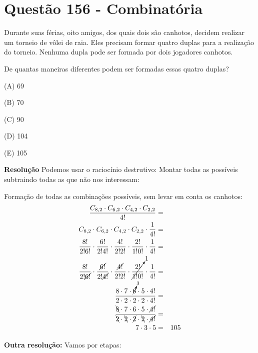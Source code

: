 \section{Questão 156 - Combinatória}

Durante suas férias, oito amigos, dos quais dois são canhotos, decidem realizar um torneio de vôlei de raia.
Eles precisam formar quatro duplas para a realização do torneio. Nenhuma dupla pode ser formada por dois jogadores canhotos.

De quantas maneiras diferentes podem ser formadas essas quatro duplas?

\noindent (A)  69

\noindent (B)  70

\noindent (C)  90

\noindent (D)  104

\noindent (E) 105

\textbf{Resolução}
Podemos usar o raciocínio destrutivo: Montar todas as possíveis subtraindo todas as que não nos interessam:

\renewcommand{\CancelColor}{\color{red}}

Formação de todas as combinações possíveis, sem levar em conta os canhotos: 
\begin{eqnarray*}
\dfrac{C_{8, 2} \cdot C_{6, 2} \cdot C_{4, 2} \cdot C_{2, 2}  }{4!} &=& \\
C_{8, 2} \cdot C_{6, 2} \cdot C_{4, 2} \cdot C_{2, 2}  \cdot \dfrac{1}{4!} &=& \\
\dfrac{8!}{2! 6!} \cdot \dfrac{6!}{2! 4!} \cdot \dfrac{4!}{2! 2!} \cdot \dfrac{2!}{1! 0!} \cdot \dfrac{1}{4!}  &=& \\
\dfrac{8!}{2! \cancel{6!}} \cdot \dfrac{\cancel{6!}}{2! \cancel{4!}} \cdot \dfrac{\cancel{4!}}{2! 2!} \cdot \cancelto{1}{\dfrac{2!}{1! 0!}} \cdot \dfrac{1}{4!}  &=& \\
\dfrac{8 \cdot 7 \cdot \cancelto{3}{6} \cdot 5 \cdot 4!}{2 \cdot 2 \cdot 2 \cdot 2 \cdot 4!}  &=& \\
\dfrac{\bcancel{8} \cdot 7 \cdot 6 \cdot 5 \cdot \cancel{4!}}{\bcancel{2} \cdot \bcancel{2} \cdot \cancel{2} \cdot \bcancel{2} \cdot \cancel{4!}}  &=& \\
7 \cdot 3 \cdot 5  &=& 105\\
\end{eqnarray*}

\textbf{Outra resolução:}
Vamos por etapas:

